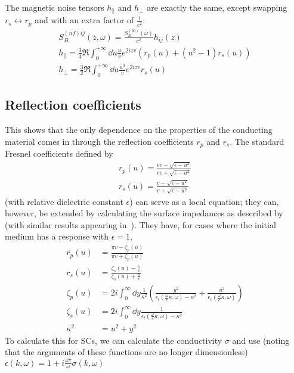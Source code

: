 \documentclass[../main.tex]{subfiles}
\begin{document}
	The magnetic noise tensors $h_\parallel$ and $h_\perp$ are exactly the same, except swapping $r_s \leftrightarrow r_p$ and with an extra factor of $\frac{1}{c^2}$:
	\begin{gather}
		S^{(nf)ij}_B(z, \omega) = \frac{S^{(bb)}_E(\omega)}{c^2} h_{ij}(z) \\
		h_\parallel = \frac34 \Re \int_0^{+\infty} \dd{u} \frac{u}{v} e^{2i z v} \left(r_p(u) + \left(u^2 - 1\right) r_s(u) \right) \\
		h_\perp = \frac32 \Re \int_0^{+\infty} \dd{u} \frac{u^3}{v} e^{2 i z v} r_s(u)
	\end{gather}

	\subsection{Reflection coefficients} \label{subsec:ReflectionCoeffs}
	This shows that the only dependence on the properties of the conducting material comes in through the reflection coefficients $r_p$ and $r_s$.
	The standard Fresnel coefficients defined by
	\begin{align}
		r_p(u) = \frac{\epsilon v - \sqrt{\epsilon - u^2}}{\epsilon v + \sqrt{\epsilon - u^2}} \\
		r_s(u) = \frac{v - \sqrt{\epsilon - u^2}}{v + \sqrt{\epsilon - u^2}}
	\end{align}
	(with relative dielectric constant $\epsilon$) can serve as a local equation;
	they can, however, be extended by calculating the surface impedances as described by~\cite{Ford1984} (with similar results appearing in~\cite{Nam1967_Part2}).
	They have, for cases where the initial medium has a response with $\epsilon = 1$,
	\begin{align}
		r_p(u) &= \frac{\pi v - \zeta_p(u)}{\pi v + \zeta_p(u)} \\
		r_s(u) &= \frac{\zeta_s(u) - \frac{\pi}{v}}{\zeta_s(u) + \frac{\pi}{v}} \\
		\zeta_p(u) &= 2i \int_0^\infty \dd{y} \frac{1}{\kappa^2} \left( \frac{y^2}{\epsilon_t(\frac{\omega}{c}\kappa, \omega) - \kappa^2} + \frac{u^2}{\epsilon_\ell(\frac{\omega}{c}\kappa, \omega)} \right) \\
		\zeta_s(u) &= 2i \int_0^\infty \dd{y} \frac{1}{\epsilon_t(\frac{\omega}{c}\kappa, \omega) - \kappa^2} \\
		\kappa^2 &= u^2 + y^2
	\end{align}
	To calculate this for SCs, we can calculate the conductivity $\sigma$ and use (noting that the arguments of these functions are no longer dimensionless) $\epsilon(k, \omega) = 1 + i \frac{4 \pi}{\omega} \sigma(k, \omega)$%
\end{document}

